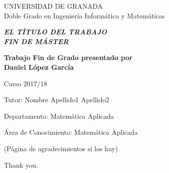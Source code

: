 \quad

\thispagestyle{empty}


\newpage 



\thispagestyle{empty}


\begin{center}

{\Large UNIVERSIDAD DE GRANADA}\\[10mm]
{\Large\sffamily Doble Grado en Ingeniería Informática y Matemáticas}\\[3mm]


\vspace{3cm}


\begin{Large}
{\slshape\bfseries  EL T\'ITULO DEL TRABAJO\\[6mm]
FIN DE M\'ASTER}
\end{Large}

\vspace{3cm}

\vfill

\begin{large}
{\bf Trabajo Fin de Grado presentado por \\[3mm]
Daniel López García}
\end{large}


\vspace{2cm}

\begin{Large}
Curso 2017/18
\end{Large}
\end{center}

\vfill

\noindent
Tutor: Nombre Apellido1 Apellido2

\noindent
Departamento: Matem\'atica Aplicada

\noindent
\'Area de Conocimiento: Matem\'atica Aplicada

\newpage


\thispagestyle{empty}

\quad

\newpage

\thispagestyle{empty}

\vspace*{2cm}

\begin{flushright}
\parbox{3.5in}
{\small
(P\'agina de agradecimientos si los hay)


Thank you.}

\end{flushright}

\newpage

